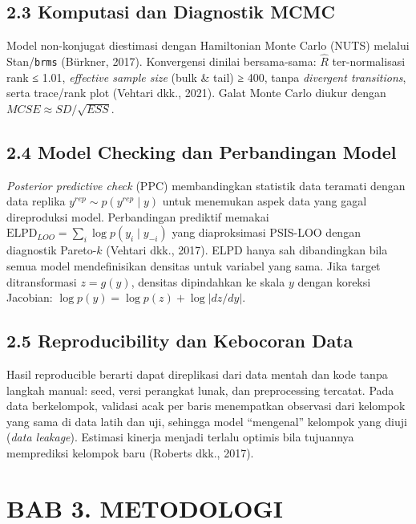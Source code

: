 \documentclass[
]{article}
\begin{document}
\subsection{2.3 Komputasi dan Diagnostik
MCMC}\label{komputasi-dan-diagnostik-mcmc}

Model non-konjugat diestimasi dengan Hamiltonian Monte Carlo (NUTS)
melalui Stan/\texttt{brms} (Bürkner, 2017). Konvergensi dinilai
bersama-sama: \(\hat R\) ter-normalisasi rank ≤ 1.01, \emph{effective
sample size} (bulk \& tail) ≥ 400, tanpa \emph{divergent transitions},
serta trace/rank plot (Vehtari dkk., 2021). Galat Monte Carlo diukur
dengan \(MCSE \approx SD/\sqrt{ESS}\).

\subsection{2.4 Model Checking dan Perbandingan
Model}\label{model-checking-dan-perbandingan-model}

\emph{Posterior predictive check} (PPC) membandingkan statistik data
teramati dengan data replika \(y^{rep}\sim p(y^{rep}\mid y)\) untuk
menemukan aspek data yang gagal direproduksi model. Perbandingan
prediktif memakai \(\text{ELPD}_{LOO}=\sum_i \log p(y_i\mid y_{-i})\)
yang diaproksimasi PSIS-LOO dengan diagnostik Pareto-\(k\) (Vehtari
dkk., 2017). ELPD hanya sah dibandingkan bila semua model mendefinisikan
densitas untuk variabel yang sama. Jika target ditransformasi
\(z=g(y)\), densitas dipindahkan ke skala \(y\) dengan koreksi Jacobian:
\(\log p(y)=\log p(z)+\log|dz/dy|\).

\subsection{2.5 Reproducibility dan Kebocoran
Data}\label{reproducibility-dan-kebocoran-data}

Hasil reproducible berarti dapat direplikasi dari data mentah dan kode
tanpa langkah manual: seed, versi perangkat lunak, dan preprocessing
tercatat. Pada data berkelompok, validasi acak per baris menempatkan
observasi dari kelompok yang sama di data latih dan uji, sehingga model
``mengenal'' kelompok yang diuji (\emph{data leakage}). Estimasi kinerja
menjadi terlalu optimis bila tujuannya memprediksi kelompok baru
(Roberts dkk., 2017).

\section{BAB 3. METODOLOGI}\label{bab-3.-metodologi}
\end{document}
